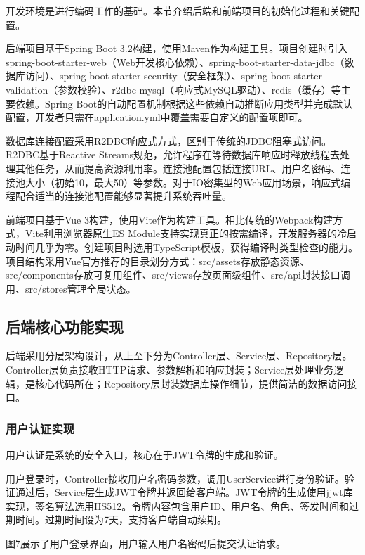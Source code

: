 \documentclass[UTF8,AutoFakeBold=1,AutoFakeSlant,zihao=-4]{SCAU}
\begin{document}
 开发环境是进行编码工作的基础。本节介绍后端和前端项目的初始化过程和关键配置。

 后端项目基于Spring Boot 3.2构建，使用Maven作为构建工具。项目创建时引入spring-boot-starter-web（Web开发核心依赖）、spring-boot-starter-data-jdbc（数据库访问）、spring-boot-starter-security（安全框架）、spring-boot-starter-validation（参数校验）、r2dbc-mysql（响应式MySQL驱动）、redis（缓存）等主要依赖。Spring Boot的自动配置机制根据这些依赖自动推断应用类型并完成默认配置，开发者只需在application.yml中覆盖需要自定义的配置项即可。

 数据库连接配置采用R2DBC响应式方式，区别于传统的JDBC阻塞式访问。R2DBC基于Reactive Streams规范，允许程序在等待数据库响应时释放线程去处理其他任务，从而提高资源利用率。连接池配置包括连接URL、用户名密码、连接池大小（初始10，最大50）等参数。对于IO密集型的Web应用场景，响应式编程配合适当的连接池配置能够显著提升系统吞吐量{\citep{Vashisht2025}}。

 前端项目基于Vue 3构建，使用Vite作为构建工具。相比传统的Webpack构建方式，Vite利用浏览器原生ES Module支持实现真正的按需编译，开发服务器的冷启动时间几乎为零。创建项目时选用TypeScript模板，获得编译时类型检查的能力。项目结构采用Vue官方推荐的目录划分方式：src/assets存放静态资源、src/components存放可复用组件、src/views存放页面级组件、src/api封装接口调用、src/stores管理全局状态。

 \subsection{后端核心功能实现}

 后端采用分层架构设计，从上至下分为Controller层、Service层、Repository层。Controller层负责接收HTTP请求、参数解析和响应封装；Service层处理业务逻辑，是核心代码所在；Repository层封装数据库操作细节，提供简洁的数据访问接口。

\subsubsection{用户认证实现}

用户认证是系统的安全入口，核心在于JWT令牌的生成和验证。

用户登录时，Controller接收用户名密码参数，调用UserService进行身份验证。验证通过后，Service层生成JWT令牌并返回给客户端。JWT令牌的生成使用jjwt库实现，签名算法选用HS512。令牌内容包含用户ID、用户名、角色、签发时间和过期时间。过期时间设为7天，支持客户端自动续期。

图7展示了用户登录界面，用户输入用户名密码后提交认证请求。
\end{document}
